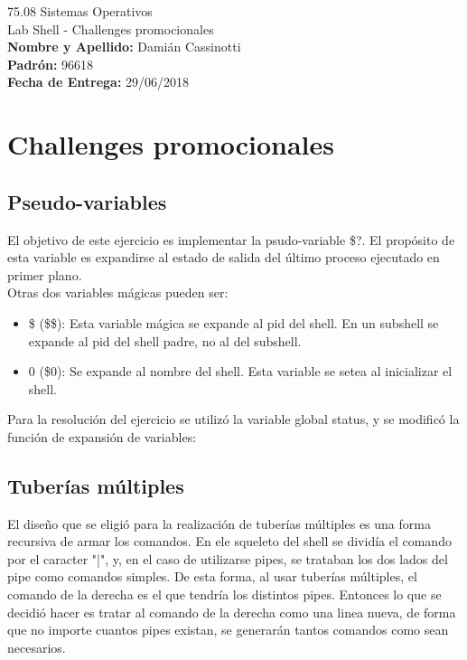 \documentclass[a4paper, 12pt]{article}
\begin{document}
		
	\begin{titlepage}
		\vspace*{\fill}
		\begin{center}
			\Large 75.08 Sistemas Operativos \\
			\Huge Lab Shell - Challenges promocionales \\
			\bigskip\bigskip\bigskip
			\large\textbf{Nombre y Apellido:} Damián Cassinotti \\
			\textbf{Padrón:} 96618 \\
			\textbf{Fecha de Entrega:} 29/06/2018\\
					
		\end{center}
		\vspace*{\fill}
	\end{titlepage}
	\pagenumbering{arabic}
	\newpage
			
	\tableofcontents
	\newpage
	
	\section{Challenges promocionales}
		\subsection{Pseudo-variables}
		El objetivo de este ejercicio es implementar la psudo-variable \$?. El propósito de esta variable es expandirse al estado de salida del último proceso ejecutado en primer plano.\\
		Otras dos variables mágicas pueden ser:
		\begin{itemize}
			\item \$ (\$\$): Esta variable mágica se expande al pid del shell. En un subshell se expande al pid del shell padre, no al del subshell.
			\item 0 (\$0): Se expande al nombre del shell. Esta variable se setea al inicializar el shell. 
		\end{itemize}
		
		Para la resolución del ejercicio se utilizó la variable global status, y se modificó la función de expansión de variables:\
		
		\bigskip\bigskip
		
		
		\subsection{Tuberías múltiples}
		El diseño que se eligió para la realización de tuberías múltiples es una forma recursiva de armar los comandos. En ele squeleto del shell se dividía el comando por el caracter "|", y, en el caso de utilizarse pipes, se trataban los dos lados del pipe como comandos simples.
		De esta forma, al usar tuberías múltiples, el comando de la derecha es el que tendría los distintos pipes. Entonces lo que se decidió hacer es tratar al comando de la derecha como una linea nueva, de forma que no importe cuantos pipes existan, se generarán tantos comandos como sean necesarios.
		
		
\end{document}

